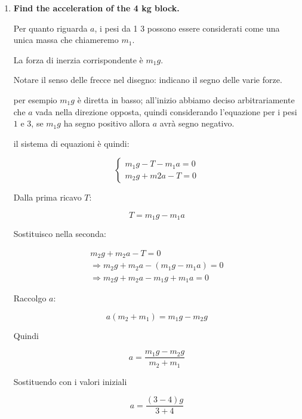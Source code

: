 \begin{enumerate}
\item \textbf{Find the acceleration of the 4 kg block.}

Per quanto riguarda $a$, i pesi da 1 3 possono essere considerati come una unica massa che chiameremo $m_1$.

La forza di inerzia corrispondente è $m_1g$.

Notare il senso delle frecce nel disegno: indicano il segno delle varie forze.

per esempio $m_1g$ è diretta in basso; all'inizio abbiamo deciso arbitrariamente che $a$ vada nella direzione opposta, quindi considerando l'equazione per i pesi $1$ e $3$, se $m_1g$ ha segno positivo allora $a$ avrà segno negativo.

il sistema di equazioni è quindi:
\setcounter{equation}{0}

\begin{equation}
\left\{
\begin{array}{ll}
m_1g -T - m_1a =0 \\
m_2g + m2a -T =0
\end{array}
\right.
\end{equation}

Dalla prima ricavo $T$:

\begin{equation}
T = m_1g-m_1a
\end{equation}

Sostituisco nella seconda:


\begin{equation}
\begin{array}{ll}
m_2g+m_2a-T=0 \\
\Rightarrow
m_2g+m_2a-(m_1g-m_1a)=0 \\
\Rightarrow
m_2g+m_2a-m_1g+m_1a=0
\end{array}
\end{equation}

Raccolgo $a$:

\begin{equation}
a(m_2+m_1)=m_1g-m_2g
\end{equation}

Quindi

\begin{equation}
a=\frac{
m_1g-m_2g
}{
m_2+m_1
}
\end{equation}

Sostituendo con i valori iniziali

\begin{equation}
a=\frac{
(3-4)g
}{
3+4
}
\end{equation}


\end{enumerate}
